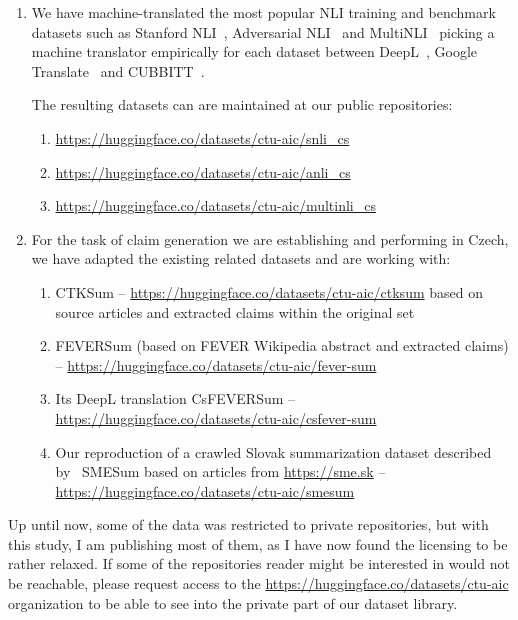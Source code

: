 \begin{enumerate}
    \item We have machine-translated the most popular NLI training and benchmark datasets such as Stanford NLI~\cite{snli:emnlp2015}, Adversarial NLI~\cite{anli} and MultiNLI~\cite{multinli} picking a machine translator empirically for each dataset between DeepL~\cite{deepl}, Google Translate~\cite{googletranslation} and CUBBITT~\cite{popel2020Transforming}.
    
    The resulting datasets can are maintained at our public repositories:
    \begin{enumerate}
        \item \url{https://huggingface.co/datasets/ctu-aic/snli_cs}
        \item \url{https://huggingface.co/datasets/ctu-aic/anli_cs}
        \item \url{https://huggingface.co/datasets/ctu-aic/multinli_cs}
    \end{enumerate}
    \item For the task of claim generation we are establishing and performing in Czech, we have adapted the existing related datasets and are working with:
    \begin{enumerate}
        \item CTKSum -- \url{https://huggingface.co/datasets/ctu-aic/ctksum} based on source articles and extracted claims within the original \CTK{} set
        \item FEVERSum (based on FEVER Wikipedia abstract and extracted claims) -- \url{https://huggingface.co/datasets/ctu-aic/fever-sum}
        \item Its DeepL translation CsFEVERSum -- \url{https://huggingface.co/datasets/ctu-aic/csfever-sum}
        \item Our reproduction of a crawled Slovak summarization dataset described by~\cite{suppa-adamec-2020-summarization} SMESum based on articles from \url{https://sme.sk} -- \url{https://huggingface.co/datasets/ctu-aic/smesum}
    \end{enumerate}
\end{enumerate}
Up until now, some of the data was restricted to private repositories, but with this study, I am publishing most of them, as I have now found the licensing to be rather relaxed.
If some of the repositories reader might be interested in would not be reachable, please request access to the  \url{https://huggingface.co/datasets/ctu-aic} organization to be able to see into the private part of our dataset library.

